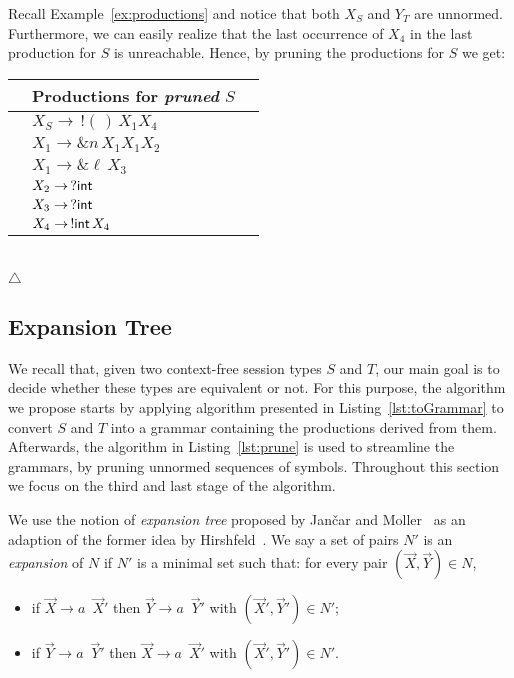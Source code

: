 \begin{example}
\label{ex:prune}
	Recall Example~\ref{ex:productions} and notice that both $X_S$ and $Y_T$ 
	are unnormed. Furthermore, we can easily realize that the last occurrence of 
	$X_4$ in the last production for $S$ is unreachable. Hence, by pruning the 
	productions for $S$ we get:\\
	
	\centering
	\begin{tabular}{l l l }
 		&Productions for \emph{pruned} $S$&  \\ \hline
 		&\hspace*{4mm}$X_S \rightarrow \,! (\,)\,X_1 X_4$ &\\
  		&\hspace*{4mm}$X_1 \rightarrow \& n\, X_1 X_1 X_2$ & \\
  		&\hspace*{4mm}$X_1 \rightarrow \& \ell\, X_3$ &\\
 		&\hspace*{4mm}$X_2 \rightarrow \,? \mathsf{int}$&\\
  		&\hspace*{4mm}$X_3 \rightarrow \,? \mathsf{int}$&\\
  		&\hspace*{4mm}$X_4 \rightarrow \,!\mathsf{int}\, X_4 $ &\\
	\end{tabular}\\
  	\hfill$\triangle$
\end{example}

\subsection{Expansion Tree}
\label{subsec:expand}

We recall that, given two context-free session types $S$ and $T$, our main goal 
is to decide whether these types are equivalent or not. For this purpose, 
the algorithm we propose starts by applying algorithm presented in
Listing~\ref{lst:toGrammar} to convert $S$ and $T$ into a grammar containing 
the productions derived from them. Afterwards, the algorithm in 
Listing~\ref{lst:prune} is used to streamline the grammars, by pruning 
unnormed sequences of symbols. Throughout this section we focus on the 
third and last stage of the algorithm.

We use the notion of \emph{expansion tree} proposed by Jan{\v{c}}ar 
and Moller~\cite{janvcar1999techniques} as an adaption of the former idea by 
Hirshfeld~\cite{hirshfeld1996bisimulation}. We say a set of pairs $N'$ is an 
\emph{expansion} of $N$ if $N'$ is a minimal set such that: for every pair 
$(\vec X, \vec Y) \in N$,
\begin{itemize}
	\item if $\vec X \rightarrow a \enspace\vec X'$ then $\vec Y \rightarrow 
		  a \enspace\vec Y'$ with $(\vec X',\vec Y')\in N'$;
	\item if $\vec Y \rightarrow a \enspace\vec Y'$ then $\vec X \rightarrow 
	      a \enspace\vec X'$ with $(\vec X',\vec Y')\in N'$.
\end{itemize}

